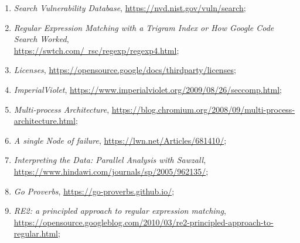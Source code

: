 \documentclass[a4paper,11pt]{article}
\begin{document}
\begin{enumerate}
\item \textit{Search Vulnerability Database},
  \href{https://nvd.nist.gov/vuln/search}{https://nvd.nist.gov/vuln/search};



\item \textit{Regular Expression Matching with a Trigram Index or How
    Google Code Search Worked}, \\
  \href{https://swtch.com/~rsc/regexp/regexp4.html}{https://swtch.com/~rsc/regexp/regexp4.html};



\item \textit{Licenses},
  \href{https://opensource.google/docs/thirdparty/licenses}{https://opensource.google/docs/thirdparty/licenses};



\item \textit{ImperialViolet},
  \href{https://www.imperialviolet.org/2009/08/26/seccomp.html}{https://www.imperialviolet.org/2009/08/26/seccomp.html};



\item \textit{Multi-process Architecture},
  \href{https://blog.chromium.org/2008/09/multi-process-architecture.html}{https://blog.chromium.org/2008/09/multi-process-architecture.html};



\item \textit{A single Node of failure},
  \href{https://lwn.net/Articles/681410/}{https://lwn.net/Articles/681410/};



\item \textit{Interpreting the Data: Parallel Analysis with Sawzall},
  \href{https://www.hindawi.com/journals/sp/2005/962135/}{https://www.hindawi.com/journals/sp/2005/962135/};



\item \textit{Go Proverbs},
  \href{https://go-proverbs.github.io/}{https://go-proverbs.github.io/};



\item \textit{RE2: a principled approach to regular expression
    matching}, \\
  \href{https://opensource.googleblog.com/2010/03/re2-principled-approach-to-regular.html}{https://opensource.googleblog.com/2010/03/re2-principled-approach-to-regular.html};




\end{enumerate}
\end{document}
